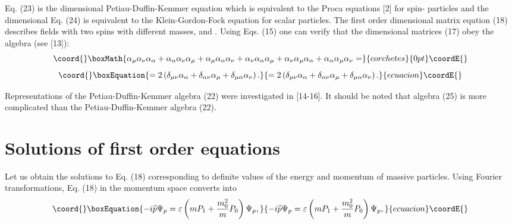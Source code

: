 \documentclass[a4paper,12pt]{article}
\begin{document}
Eq. (23) is the \coordHE{}dimensional Petiau-Duffin-Kemmer equation
which is equivalent to the Proca equations [2] for spin-\coordHE{}
particles and the \coordHE{}dimensional Eq. (24) is equivalent to the
Klein-Gordon-Fock equation for scalar particles. The first order
\coordHE{}dimensional matrix eqution (18) describes fields with two
spins \coordHE{}  \coordHE{} with different masses, \coordHE{} and \coordHE{}. Using Eqs.
(15) one can verify that the \coordHE{}dimensional matrices \myHighlight{$\alpha
_\mu $}\coordHE{} (17) obey the algebra (see [13]):
\[\coord{}\boxMath{
\alpha _\mu \alpha _\nu \alpha _\alpha +\alpha _\alpha \alpha _\nu
\alpha _\mu +\alpha _\mu \alpha _\alpha \alpha _\nu +\alpha _\nu
\alpha _\alpha \alpha _\mu +\alpha _\nu \alpha _\mu \alpha _\alpha
+\alpha _\alpha \alpha _\mu \alpha _\nu =
}{corchetes}{0pt}\coordE{}\]
\begin{equation}\coord{}\boxEquation{
=2\left( \delta _{\mu \nu }\alpha _\alpha +\delta _{\alpha \nu
}\alpha _\mu +\delta _{\mu \alpha }\alpha _\nu \right). \label{25}
}{
=2\left( \delta _{\mu \nu }\alpha _\alpha +\delta _{\alpha \nu
}\alpha _\mu +\delta _{\mu \alpha }\alpha _\nu \right). }{ecuacion}\coordE{}\end{equation}

Representations of the Petiau-Duffin-Kemmer algebra (22) were
investigated in [14-16]. It should be noted that algebra (25) is
more complicated than the Petiau-Duffin-Kemmer algebra (22).

\section{Solutions of first order equations}

Let us obtain the solutions to Eq. (18) corresponding to definite
values of the energy and momentum of massive particles. Using
Fourier transformations, Eq. (18) in the momentum space converts
into
\begin{equation}\coord{}\boxEquation{
-i\widehat{p}\Psi _p=\varepsilon \left(
mP_1+\frac{m_0^2}{m}P_0\right)\Psi _p, \label{26}
}{
-i\widehat{p}\Psi _p=\varepsilon \left(
mP_1+\frac{m_0^2}{m}P_0\right)\Psi _p, }{ecuacion}\coordE{}\end{equation}
\end{document}
